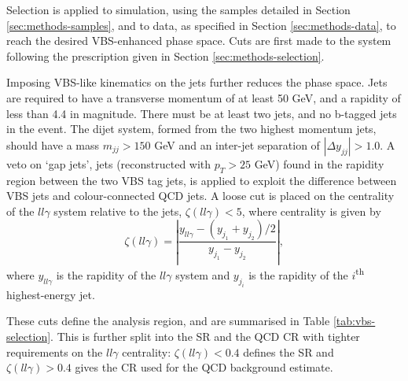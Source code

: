 
Selection is applied to simulation, using the samples detailed in Section
\ref{sec:methods-samples}, and to data, as specified in Section
\ref{sec:methods-data}, to reach the desired \ac{VBS}-enhanced phase
space. Cuts are first made to the \Zy system following the prescription given in
Section \ref{sec:methods-selection}.

Imposing \ac{VBS}-like kinematics on the jets further reduces the phase space.
Jets are required to have a transverse momentum of at least 50 GeV, and a
rapidity of less than 4.4 in magnitude. There must be at least two jets, and no
b-tagged jets in the event. The dijet system, formed from the two highest
momentum jets, should have a mass $m_{jj} > 150$ GeV and an inter-jet separation
of $|\Delta y_{jj}| > 1.0$. A veto on `gap jets', jets
(reconstructed with $p_T > 25$ GeV) found in the rapidity region between the two
VBS tag jets, is applied to exploit the difference between VBS jets and
colour-connected \ac{QCD} jets. A loose cut is placed on the centrality of the
$ll\gamma$ system relative to the jets, $\zeta(ll\gamma) < 5$, where centrality
is given by
%
\begin{equation}
  \zeta(ll\gamma) = \left|
                      \frac { y_{ll\gamma} - (y_{j_1} + y_{j_2})/2}
                            { y_{j_1} - y_{j_2} }
                    \right|,
  \label{eqn:vbs-selection-centrality}
\end{equation}
%
where $y_{ll\gamma}$ is the rapidity of the $ll\gamma$ system and $y_{j_i}$ is
the rapidity of the $i$\textsuperscript{th} highest-energy jet.

These cuts define the analysis region, and are summarised in Table
\ref{tab:vbs-selection}.  This is further split into the \ac{SR} and the
\ac{QCD} \ac{CR} with tighter requirements on the $ll\gamma$ centrality:
$\zeta(ll\gamma) < 0.4$ defines the \ac{SR} and $\zeta(ll\gamma) > 0.4$ gives
the \ac{CR} used for the \ac{QCD} \Zy background estimate.

